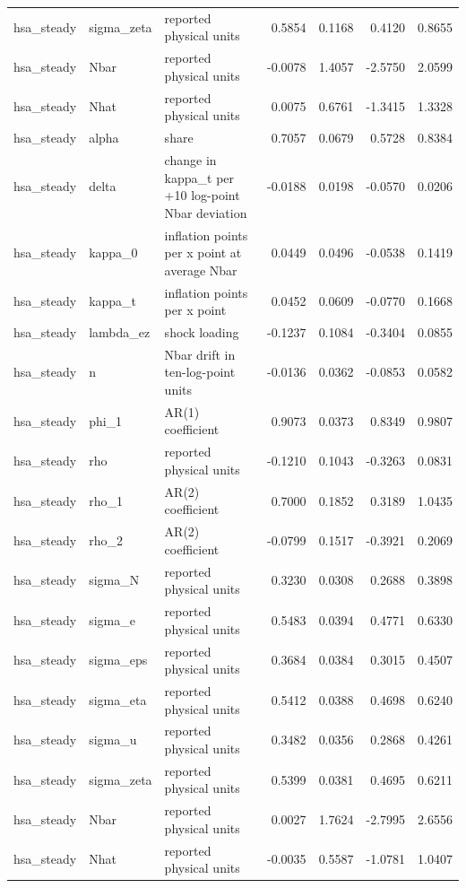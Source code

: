 \begin{tabular}{lllrrrr}
hsa\_steady & sigma\_zeta & reported physical units & 0.5854 & 0.1168 & 0.4120 & 0.8655 \\
hsa\_steady & Nbar & reported physical units & -0.0078 & 1.4057 & -2.5750 & 2.0599 \\
hsa\_steady & Nhat & reported physical units & 0.0075 & 0.6761 & -1.3415 & 1.3328 \\
hsa\_steady & alpha & share & 0.7057 & 0.0679 & 0.5728 & 0.8384 \\
hsa\_steady & delta & change in kappa\_t per +10 log-point Nbar deviation & -0.0188 & 0.0198 & -0.0570 & 0.0206 \\
hsa\_steady & kappa\_0 & inflation points per x point at average Nbar & 0.0449 & 0.0496 & -0.0538 & 0.1419 \\
hsa\_steady & kappa\_t & inflation points per x point & 0.0452 & 0.0609 & -0.0770 & 0.1668 \\
hsa\_steady & lambda\_ez & shock loading & -0.1237 & 0.1084 & -0.3404 & 0.0855 \\
hsa\_steady & n & Nbar drift in ten-log-point units & -0.0136 & 0.0362 & -0.0853 & 0.0582 \\
hsa\_steady & phi\_1 & AR(1) coefficient & 0.9073 & 0.0373 & 0.8349 & 0.9807 \\
hsa\_steady & rho & reported physical units & -0.1210 & 0.1043 & -0.3263 & 0.0831 \\
hsa\_steady & rho\_1 & AR(2) coefficient & 0.7000 & 0.1852 & 0.3189 & 1.0435 \\
hsa\_steady & rho\_2 & AR(2) coefficient & -0.0799 & 0.1517 & -0.3921 & 0.2069 \\
hsa\_steady & sigma\_N & reported physical units & 0.3230 & 0.0308 & 0.2688 & 0.3898 \\
hsa\_steady & sigma\_e & reported physical units & 0.5483 & 0.0394 & 0.4771 & 0.6330 \\
hsa\_steady & sigma\_eps & reported physical units & 0.3684 & 0.0384 & 0.3015 & 0.4507 \\
hsa\_steady & sigma\_eta & reported physical units & 0.5412 & 0.0388 & 0.4698 & 0.6240 \\
hsa\_steady & sigma\_u & reported physical units & 0.3482 & 0.0356 & 0.2868 & 0.4261 \\
hsa\_steady & sigma\_zeta & reported physical units & 0.5399 & 0.0381 & 0.4695 & 0.6211 \\
hsa\_steady & Nbar & reported physical units & 0.0027 & 1.7624 & -2.7995 & 2.6556 \\
hsa\_steady & Nhat & reported physical units & -0.0035 & 0.5587 & -1.0781 & 1.0407 \\

\end{tabular}
